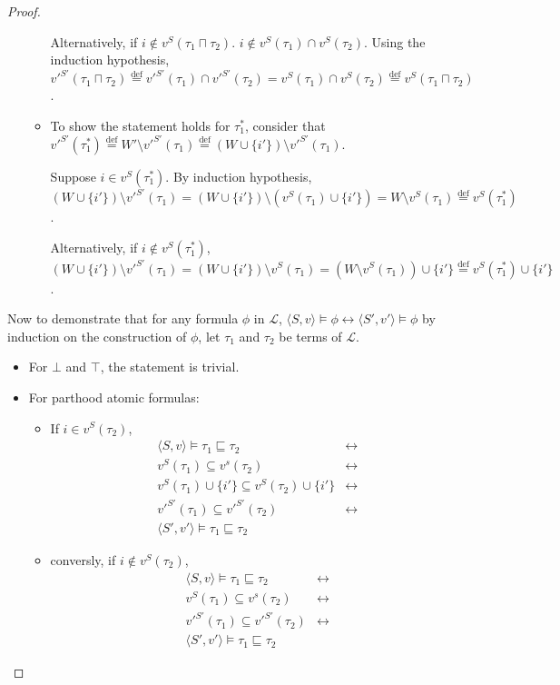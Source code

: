 \documentclass{article}
\newcommand{\lang}{\mathcal{L}}
\newcommand{\lcap}{\sqcap}
\newcommand{\lstar}{^*}
\newcommand{\lpart}{\sqsubseteq}
\newcommand{\eqdef}{\stackrel{\text{def}}{=}}
\begin{document}
\begin{proof}
\begin{itemize}
\begin{itemize}
      Alternatively, if $i \not \in v^S(\tau_1 \lcap \tau_2)$. $i \not \in v^S(\tau_1) \cap v^S(\tau_2)$. Using the induction hypothesis, $v'^{S'}(\tau_1 \lcap \tau_2) \eqdef v'^{S'}(\tau_1) \cap v'^{S'}(\tau_2) = v^S(\tau_1) \cap v^S(\tau_2) \eqdef v^S(\tau_1 \lcap \tau_2)$.

    \item To show the statement holds for $\tau_1\lstar$, consider that $v'^{S'}(\tau_1\lstar) \eqdef W' \setminus v'^{S'}(\tau_1) \eqdef (W \cup \{i'\}) \setminus v'^{S'}(\tau_1)$.

      Suppose $i \in v^S(\tau_1\lstar)$. By induction hypothesis, $(W \cup \{i'\}) \setminus v'^{S'}(\tau_1) = (W \cup \{i'\}) \setminus (v^S(\tau_1) \cup \{i'\}) = W \setminus v^S(\tau_1) \eqdef v^S(\tau_1\lstar)$.

      Alternatively, if $i \not \in v^S(\tau_1\lstar)$, $(W \cup \{i'\}) \setminus v'^{S'}(\tau_1) = (W \cup \{i'\}) \setminus v^S(\tau_1) = (W \setminus v^S(\tau_1)) \cup \{i'\} \eqdef v^S(\tau_1\lstar) \cup \{i'\}$.
    \end{itemize}
\end{itemize}
Now to demonstrate that for any formula $\phi$ in $\lang$, $\langle S, v \rangle \models \phi \longleftrightarrow \langle S', v' \rangle \models \phi$ by induction on the construction of $\phi$, let $\tau_1$ and $\tau_2$ be terms of $\lang$.
\begin{itemize}
  \item For $\bot$ and $\top$, the statement is trivial.
  \item For parthood atomic formulas:
    \begin{itemize}
    \item If $i \in v^S(\tau_2)$,
      \begin{align*}
        \langle S, v \rangle \models \tau_1 \lpart \tau_2 &\longleftrightarrow \\
        v^S(\tau_1) \subseteq v^s(\tau_2) &\longleftrightarrow \\
        v^S(\tau_1) \cup \{i'\} \subseteq v^S(\tau_2) \cup \{i'\} &\longleftrightarrow \\
        v'^{S'}(\tau_1) \subseteq v'^{S'}(\tau_2) &\longleftrightarrow \\
        \langle S', v' \rangle \models \tau_1 \lpart \tau_2
      \end{align*}
    \item conversly, if $i \not \in v^S(\tau_2)$,
      \begin{align*}
        \langle S, v \rangle \models \tau_1 \lpart \tau_2 &\longleftrightarrow \\
        v^S(\tau_1) \subseteq v^s(\tau_2) &\longleftrightarrow \\
        v'^{S'}(\tau_1) \subseteq v'^{S'}(\tau_2) &\longleftrightarrow \\
        \langle S', v' \rangle \models \tau_1 \lpart \tau_2
      \end{align*}


\end{itemize}
\end{itemize}
\end{proof}
\end{document}
